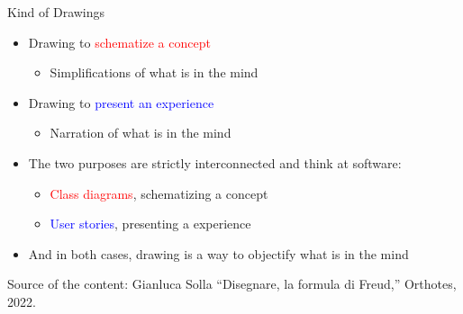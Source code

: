 \documentclass{beamer}
\begin{document}
\begin{frame}
{\centerline{Kind of Drawings}}
 
\begin{itemize}
    \item Drawing to \textcolor{red}{schematize a concept}
    \begin{itemize}
    \item Simplifications of what is in the mind
   \end{itemize}
    \item Drawing to \textcolor{blue}{present an experience}
    \begin{itemize}
    \item Narration of what is in the mind
   \end{itemize}
   \item The two purposes are strictly interconnected and think at software:
       \begin{itemize}
           \item \textcolor{red}{Class diagrams}, schematizing a concept
    	\item \textcolor{blue}{User stories}, presenting a experience
   \end{itemize}
   \item And in both cases, drawing is a way to objectify what is in the mind
 \end{itemize} 


\begin{center}
\tiny
Source of the content: Gianluca Solla ``Disegnare, la formula di Freud,'' Orthotes, 2022.
\end{center}
\end{frame}
\end{document}
